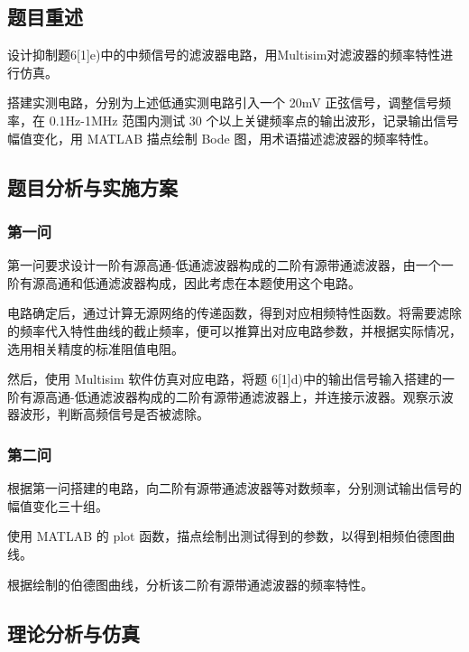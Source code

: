 \documentclass[./测控三级项目.tex]{subfiles} %
\begin{document}
	\subsection{题目重述}
		\begin{compactenum}
			\item 设计抑制题6[1]e)中的中频信号的滤波器电路，用Multisim对滤波器的频率特性进行仿真。
			\item 搭建实测电路，分别为上述低通实测电路引入一个 20mV 正弦信号，调整信号频率，在 0.1Hz-1MHz 范围内测试 30 个以上关键频率点的输出波形，记录输出信号幅值变化，用 MATLAB 描点绘制 Bode 图，用术语描述滤波器的频率特性。
		\end{compactenum}
	\subsection{题目分析与实施方案}
		\subsubsection{第一问}
			第一问要求设计一阶有源高通-低通滤波器构成的二阶有源带通滤波器，由一个一阶有源高通和低通滤波器构成，因此考虑在本题使用这个电路。 \par
			电路确定后，通过计算无源网络的传递函数，得到对应相频特性函数。将需要滤除的频率代入特性曲线的截止频率，便可以推算出对应电路参数，并根据实际情况，选用相关精度的标准阻值电阻。\par 
			然后，使用 Multisim 软件仿真对应电路，将题 6[1]d)中的输出信号输入搭建的一阶有源高通-低通滤波器构成的二阶有源带通滤波器上，并连接示波器。观察示波器波形，判断高频信号是否被滤除。
		\subsubsection{第二问}
			根据第一问搭建的电路，向二阶有源带通滤波器等对数频率，分别测试输出信号的幅值变化三十组。\par 
			使用 MATLAB 的 plot 函数，描点绘制出测试得到的参数，以得到相频伯德图曲线。\par 
			根据绘制的伯德图曲线，分析该二阶有源带通滤波器的频率特性。
	
	\subsection{理论分析与仿真}
\end{document}
